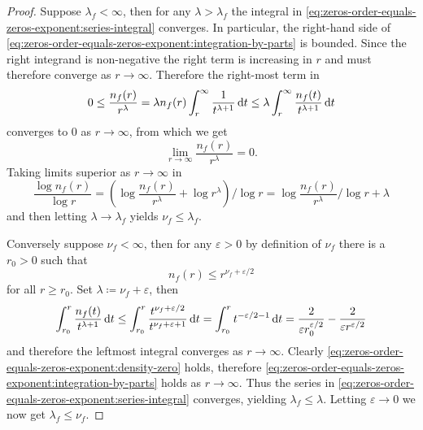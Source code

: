 \begin{proof}
    Suppose $\lambda_f < \infty$, then for any $\lambda > \lambda_f$ the integral in \eqref{eq:zeros-order-equals-zeros-exponent:series-integral} converges. In particular, the right-hand side of \eqref{eq:zeros-order-equals-zeros-exponent:integration-by-parts} is bounded. Since the right integrand is non-negative the right term is increasing in $r$ and must therefore converge as $r \to \infty$. Therefore the right-most term in
    $$ 0 \leq \frac{n_f(r)}{r^\lambda} = \lambda n_f(r) \int_r^\infty \frac{1}{t^{\lambda + 1}} \mathop{}\!\mathrm{d} t \leq \lambda \int_r^\infty \frac{n_f(t)}{t^{\lambda + 1}} \mathop{}\!\mathrm{d} t $$
    converges to $0$ as $r \to \infty$, from which we get
    \begin{equation} \label{eq:zeros-order-equals-zeros-exponent:density-zero}
        \lim_{r \to \infty} \frac{n_f(r)}{r^\lambda} = 0.
    \end{equation}
    Taking limits superior as $r \to \infty$ in
    $$ \frac{\log n_f(r)}{\log r} = \left( \log \frac{n_f(r)}{r^\lambda} + \log r^\lambda\right)/{\log r} = \log \frac{n_f(r)}{r^\lambda} / \log r + \lambda $$
    and then letting $\lambda \to \lambda_f$ yields $\nu_f \leq \lambda_f$.

    Conversely suppose $\nu_f < \infty$, then for any $\varepsilon > 0$ by definition of $\nu_f$ there is a $r_0 > 0$ such that
    $$ n_f(r) \leq r^{\nu_f + \varepsilon / 2} $$
    for all $r \geq r_0$. Set $\lambda \coloneqq \nu_f + \varepsilon$, then
    $$ \int_{r_0}^r \frac{n_f(t)}{t^{\lambda + 1}} \mathop{}\!\mathrm{d} t \leq \int_{r_0}^r \frac{t^{\nu_f + \varepsilon / 2}}{t^{\nu_f + \varepsilon + 1}} \mathop{}\!\mathrm{d} t = \int_{r_0}^r t^{-\varepsilon/2 - 1} \mathop{}\!\mathrm{d} t = \frac{2}{\varepsilon r_0^{\varepsilon / 2}} - \frac{2}{\varepsilon r^{\varepsilon / 2}} $$
    and therefore the leftmost integral converges as $r \to \infty$. Clearly \eqref{eq:zeros-order-equals-zeros-exponent:density-zero} holds, therefore \eqref{eq:zeros-order-equals-zeros-exponent:integration-by-parts} holds as $r \to \infty$. Thus the series in \eqref{eq:zeros-order-equals-zeros-exponent:series-integral} converges, yielding $\lambda_f \leq \lambda$. Letting $\varepsilon \to 0$ we now get $\lambda_f \leq \nu_f$.
\end{proof}

\iffalse
\begin{example} \label{exm:exponent-of-convergence}
    Consider $f(z) \coloneqq \sin(z) \in H(\C)$, we want to calculate $\lambda_f$ and $\rho_f$. First, let $\lambda > 0$ and recall that $f$ has zeros at $(n \pi)_{n \in \Z}$. Since
    $$ \sum_{n \in \Z \setminus \{0\}} \frac{1}{\vert n \pi \vert^\lambda} = \frac{2}{\pi^\lambda} \sum_{n=1}^\infty \frac{1}{n^\lambda} $$
    is finite if and only if $\lambda > 1$, we obtain $\lambda_f = 1$. Furthermore, we have $\vert \sin(z) \vert \leq e^{\vert z \vert}$
    and therefore $M_f(r) \leq e^r$, whereby $\rho_f \leq 1$. Finally, \Cref{thm:inequality-order-exponent-of-convergence} concludes $\rho_f = 1$.
\end{example}
\fi